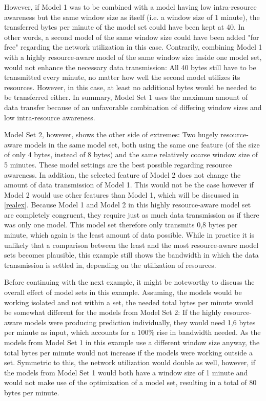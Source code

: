 However, if Model 1 was to be combined with a model having low intra-resource awareness but the same window size as itself (i.e. a window size of 1 minute), the transferred bytes per minute of the model set could have been kept at 40. In other words, a second model of the same window size could have been added "for free" regarding the network utilization in this case. Contrarily, combining Model 1 with a highly resource-aware model of the same window size inside one model set, would not enhance the necessary data transmission: All 40 bytes still have to be transmitted every minute, no matter how well the second model utilizes its resources. However, in this case, at least no additional bytes would be needed to be transferred either. In summary, Model Set 1 uses the maximum amount of data transfer because of an unfavorable combination of differing window sizes and low intra-resource awareness.

Model Set 2, however, shows the other side of extremes: Two hugely resource-aware models in the same model set, both using the same one feature (of the size of only 4 bytes, instead of 8 bytes) and the same relatively coarse window size of 5 minutes. These model settings are the best possible regarding resource awareness. In addition, the selected feature of Model 2 does not change the amount of data transmission of Model 1. This would not be the case however if Model 2 would use other features than Model 1, which will be discussed in \autoref{realex}. Because Model 1 and Model 2 in this highly resource-aware model set are completely congruent, they require just as much data transmission as if there was only one model. This model set therefore only transmits 0,8 bytes per minute, which again is the least amount of data possible. While in practice it is unlikely that a comparison between the least and the most resource-aware model sets becomes plausible, this example still shows the bandwidth in which the data transmission is settled in, depending on the utilization of resources.

Before continuing with the next example, it might be noteworthy to discuss the overall effect of model sets in this example. Assuming, the models would be working isolated and not within a set, the needed total bytes per minute would be somewhat different for the models from Model Set 2: If the highly resource-aware models were producing prediction individually, they would need 1,6 bytes per minute as input, which accounts for a $100\%$ rise in bandwidth needed. As the models from Model Set 1 in this example use a different window size anyway, the total bytes per minute would not increase if the models were working outside a set. Symmetric to this, the network utilization would double as well, however, if the models from Model Set 1 would both have a window size of 1 minute and would not make use of the optimization of a model set, resulting in a total of 80 bytes per minute.

